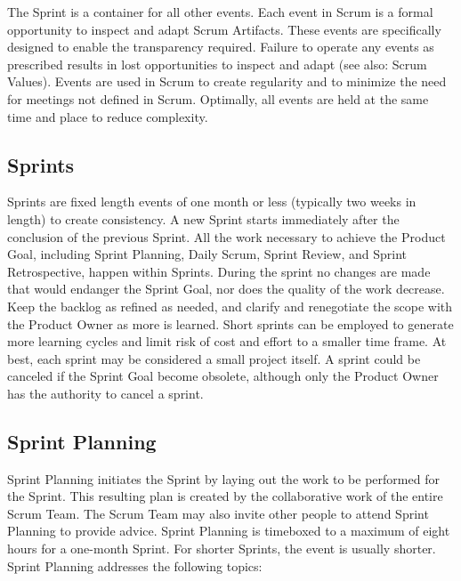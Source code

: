 \begin{flushleft}
	The Sprint is a container for all other events. Each event in Scrum is a formal
	opportunity to inspect and adapt Scrum Artifacts. These events are specifically
	designed to enable the transparency required. Failure to operate any events as
	prescribed results in lost opportunities to inspect and adapt (see also: Scrum Values).
	Events are used in Scrum to create regularity and to minimize the need for meetings
	not defined in Scrum. Optimally, all events are held at the same time and place
	to reduce complexity.
\end{flushleft}

\subsection{Sprints}\label{scrum-sprints}

\begin{flushleft}
	Sprints are fixed length events of one month or less (typically two weeks in
	length) to create consistency. A new Sprint starts immediately after the conclusion
	of the previous Sprint. All the work necessary to achieve the Product Goal, including
	Sprint Planning, Daily Scrum, Sprint Review, and Sprint Retrospective, happen within
	Sprints. During the sprint no changes are made that would endanger the Sprint Goal,
	nor does the quality of the work decrease. Keep the backlog as refined as needed,
	and clarify and renegotiate the scope with the Product Owner as more is learned.
	Short sprints can be employed to generate more learning cycles and limit risk
	of cost and effort to a smaller time frame. At best, each sprint may be considered
	a small project itself. A sprint could be canceled if the Sprint Goal become
	obsolete, although only the Product Owner has the authority to cancel a sprint.
\end{flushleft}

\subsection{Sprint Planning}\label{scrum=srpint-planning}

\begin{flushleft}
	Sprint Planning initiates the Sprint by laying out the work to be performed
	for the Sprint. This resulting plan is created by the collaborative work of
	the entire Scrum Team. The Scrum Team may also invite other people to attend
	Sprint Planning to provide advice. Sprint Planning is timeboxed to a maximum
	of eight hours for a one-month Sprint. For shorter Sprints, the event is
	usually shorter. Sprint Planning addresses the following topics:
\end{flushleft}

